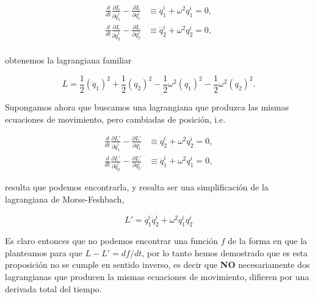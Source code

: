 \documentclass[a4paper,10pt]{article}
\numberwithin{equation}{section}
\begin{document}
\begin{align}
 \frac{d}{dt}\frac{\partial L}{\partial \dot{q}^i_1} - \frac{\partial L}{\partial q^i_1} 
 &\equiv  \ddot{q}^i_1 + \omega^2 q^i_1 = 0, \\
 \frac{d}{dt}\frac{\partial L}{\partial \dot{q}^i_2} - \frac{\partial L}{\partial q^i_2} 
 &\equiv  \ddot{q}^i_2 + \omega^2 q^i_2 = 0, \\
\end{align}

obtenemos la lagrangiana familiar

\begin{equation}
 L = \frac{1}{2} (\dot{q}_1)^2 + \frac{1}{2} (\dot{q}_2)^2 - \frac{1}{2} \omega^2 (q_1)^2 
 - \frac{1}{2} \omega^2 (q_2)^2.
\end{equation}

Supongamos ahora que buscamos una lagrangiana que produzca las mismas ecuaciones de 
movimiento, pero cambiadas de posición, i.e.

\begin{align}
 \frac{d}{dt}\frac{\partial L'}{\partial \dot{q}^i_1} - \frac{\partial L'}{\partial q^i_1} 
 &\equiv \ddot{q}^i_2 + \omega^2 q^i_2 = 0, \\
 \frac{d}{dt}\frac{\partial L'}{\partial \dot{q}^i_2} - \frac{\partial L'}{\partial q^i_2} 
 &\equiv  \ddot{q}^i_1 + \omega^2 q^i_1 = 0,
\end{align}

resulta que podemos encontrarla, y resulta ser una simplificación de la lagrangiana 
de Morse-Feshbach, 

\begin{equation}
 L' = \dot{q}^i_1\dot{q}^i_2 + \omega^2 q^i_1 q^i_2
\end{equation}

Es claro entonces que no podemos encontrar una función $f$ de la forma en que la planteamos 
para que $L - L' = df/dt$, por lo tanto hemos demostrado que es esta proposición no 
se cumple en sentido inverso, es decir que \textbf{NO} necesariamente dos lagrangianas que 
producen la mismas ecuaciones de movimiento, difieren por una derivada total del tiempo. 
\end{document}
